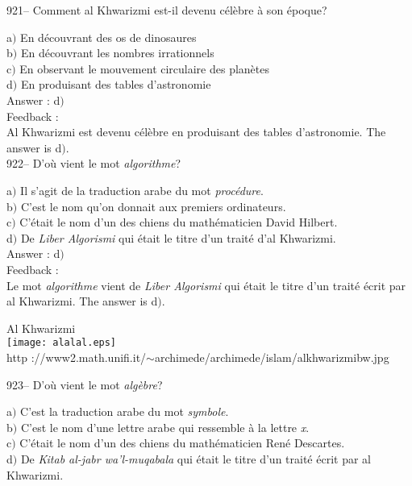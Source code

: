 \documentclass[letterpaper, 12pt]{article}
\begin{document}
921-- Comment al Khwarizmi est-il devenu c\'el\`ebre \`a son
\'epoque?

a$)$ En d\'ecouvrant des os de dinosaures \\
b$)$ En d\'ecouvrant les nombres irrationnels \\
c$)$ En observant le mouvement circulaire des plan\`etes \\
d$)$ En produisant des tables d'astronomie \\

Answer : d$)$\\

Feedback : \\
Al Khwarizmi est devenu c\'el\`ebre en produisant des tables d'astronomie.
The answer is d$)$.\\

922-- D'o\`u vient le mot {\sl algorithme}?

a$)$ Il s'agit de la traduction arabe du mot {\sl proc\'edure}. \\
b$)$ C'est le nom qu'on donnait aux premiers ordinateurs. \\
c$)$ C'\'etait le nom d'un des chiens du math\'ematicien David Hilbert. \\
d$)$ De {\sl Liber Algorismi} qui \'etait le titre d'un trait\'e d'al
Khwarizmi. \\

Answer : d$)$\\

Feedback :\\
Le mot {\sl algorithme} vient de {\sl Liber Algorismi} qui \'etait le titre
d'un trait\'e \'ecrit par al Khwarizmi. The answer is d$)$.\\

        \begin{center}
        Al Khwarizmi\\
    \texttt{[image: alalal.eps]}\\
        {\footnotesize http
://www2.math.unifi.it/$\sim$archimede/archimede/islam/alkhwarizmibw.jpg}
    \end{center}

923-- D'o\`u vient le mot {\sl alg\`ebre}?

a$)$ C'est la traduction arabe du mot {\sl symbole}. \\
b$)$ C'est le nom d'une lettre arabe qui ressemble \`a la lettre {\sl x}. \\
c$)$ C'\'etait le nom d'un des chiens du math\'ematicien Ren\'e Descartes.
\\
d$)$ De {\sl Kitab al-jabr wa'l-muqabala} qui \'etait le titre d'un trait\'e
\'ecrit par al Khwarizmi. \\
\end{document}
